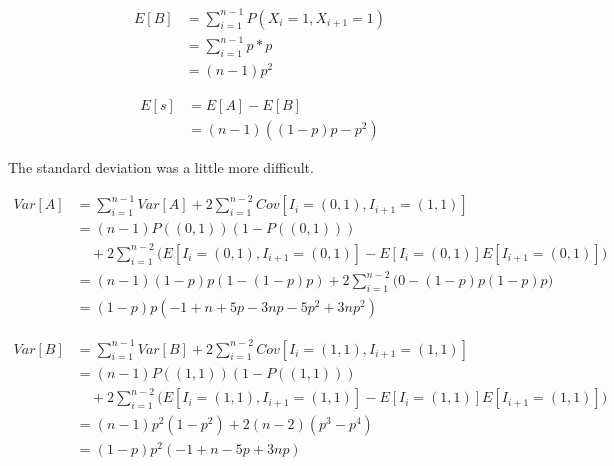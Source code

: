 \documentclass[12pt]{article}
\begin{document}
    \begin{equation*}
        \begin{split}
        E[B]& =\sum_{i=1}^{n-1}P(X_i=1,X_{i+1}=1) \\
            & =\sum_{i=1}^{n-1}p*p \\
            & =(n-1)p^2
        \end{split}
    \end{equation*}

    \begin{equation*}
        \begin{split}
        E[s]& =E[A]-E[B] \\
                  & =(n-1)\left((1-p)p-p^2\right)
        \end{split}
    \end{equation*}

    The standard deviation was a little more difficult.

    \begin{equation*}
        \begin{split}
        Var[A]& =\sum_{i=1}^{n-1}Var[A]+2\sum_{i=1}^{n-2}Cov[I_i=(0,1),I_{i+1}=
                 (1,1)] \\
              & =(n-1)P((0,1))(1-P((0,1))) \\
              & \quad +2\sum_{i=1}^{n-2}\bigg(E[I_i=(0,1),I_{i+1}=(0,1)]-E[I_i=
                (0,1)]E[I_{i+1}=(0,1)]\bigg) \\
              & =(n-1)(1-p)p(1-(1-p)p)+2\sum_{i=1}^{n-2}\bigg(0-(1-p)p(1-p)p
                \bigg) \\
              & =(1-p)p(-1+n+5p-3np-5p^2+3np^2)
        \end{split}
    \end{equation*}

    \begin{equation*}
        \begin{split}
        Var[B]& =\sum_{i=1}^{n-1}Var[B]+2\sum_{i=1}^{n-2}Cov[I_i=(1,1),I_{i+1}=
                (1,1)] \\
              & =(n-1)P((1, 1))(1-P((1, 1))) \\
              & \quad +2\sum_{i=1}^{n-2}\bigg(E[I_i=(1,1),I_{i+1}=(1,1)]-E[I_i=
                (1,1)]E[I_{i+1}=(1,1)]\bigg) \\
              & =(n-1)p^2(1-p^2)+2(n-2)(p^3-p^4) \\
              & =(1-p)p^2(-1+n-5p+3np)
        \end{split}
    \end{equation*}
\end{document}
